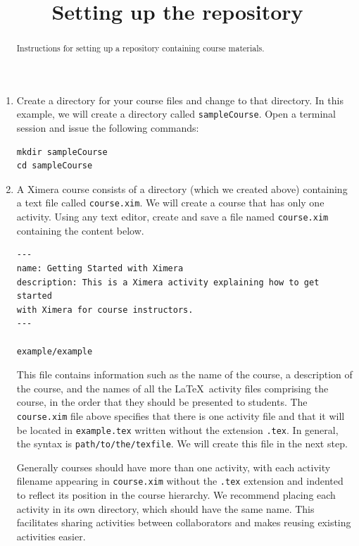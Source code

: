 \documentclass{ximera}
\title{Setting up the repository}
\begin{document}
\begin{abstract}
Instructions for setting up a repository containing course materials.
\end{abstract}
\maketitle

\begin{enumerate}
\item Create a directory for your course files
and change to that directory.
In this example, we will create a directory called \verb!sampleCourse!.
Open a terminal session and issue the following commands:
\begin{center}
\begin{verbatim}
mkdir sampleCourse
cd sampleCourse 
\end{verbatim}
\end{center}
\item A Ximera course consists of a directory (which we created above)
containing a text file called \verb!course.xim!. 
We will create a course that has only one activity.
Using any text editor,
create and save a file named
\verb!course.xim! containing the content below.

\begin{verbatim}
---
name: Getting Started with Ximera
description: This is a Ximera activity explaining how to get started
with Ximera for course instructors.
---

example/example
\end{verbatim}

\begin{remark}
This file contains information such as
the name of the course, a description of the course,
and the names of all the \LaTeX\ activity files 
comprising the course, in the order
that they should be presented to students.
The \verb!course.xim! file above specifies that 
there is one activity file 
and that it will be located in \verb!example.tex!
written without the extension \verb!.tex!. 
In general, the syntax is \verb!path/to/the/texfile!.
We will
create this file in the next step.

Generally courses should have more than one activity,
with each activity filename appearing in \verb!course.xim!
without the \verb!.tex! extension and
indented to reflect its position in the course hierarchy.
We recommend placing each
activity in its own directory, which should have the same name.
This facilitates
sharing activities between collaborators and makes reusing existing
activities easier.
\end{remark}


\end{enumerate}
\end{document}
